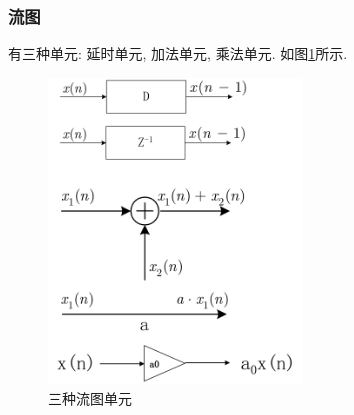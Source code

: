 \documentclass{ctexart}
\begin{document}
\subsubsection{流图}
    有三种单元: 延时单元, 加法单元, 乘法单元. 如图\ref{sys-unit-graph}所示.
    \begin{figure}[ht!]
    \centering
    \includegraphics[width=0.6\textwidth]{sys-unit-graph.png}
    \caption{三种流图单元}
    \label{sys-unit-graph}
    \end{figure}
\end{document}
